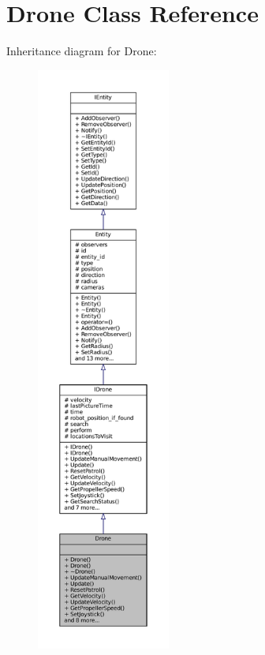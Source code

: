 \hypertarget{classDrone}{}\section{Drone Class Reference}
\label{classDrone}


Inheritance diagram for Drone\+:\nopagebreak
\begin{figure}[H]
\begin{center}
\leavevmode
\includegraphics[height=550pt]{classDrone__inherit__graph}
\end{center}
\end{figure}


